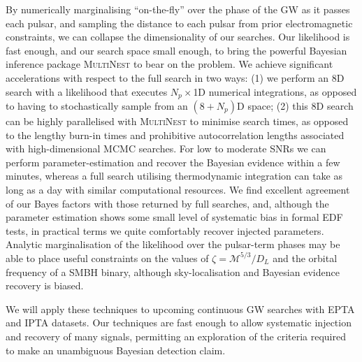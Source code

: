 \documentclass[prd,twocolumn,showpacs,nofootinbib]{revtex4}
\begin{document}
By numerically marginalising ``on-the-fly'' over the phase of the GW as it passes each pulsar, and sampling the distance to each pulsar from prior electromagnetic constraints, we can collapse the dimensionality of our searches. Our likelihood is fast enough, and our search space small enough, to bring the powerful Bayesian inference package \textsc{MultiNest} to bear on the problem. We achieve significant accelerations with respect to the full search in two ways: (1) we perform an 8D search with a likelihood that executes $N_p\times$1D numerical integrations, as opposed to having to stochastically sample from an $(8+N_p)$D space; (2) this 8D search can be highly parallelised with \textsc{MultiNest} to minimise search times, as opposed to the lengthy burn-in times and prohibitive autocorrelation lengths associated with high-dimensional MCMC searches. For low to moderate SNRs we can perform parameter-estimation and recover the Bayesian evidence within a few minutes, whereas a full search utilising thermodynamic integration can take as long as a day with similar computational resources. We find excellent agreement of our Bayes factors with those returned by full searches, and, although the parameter estimation shows some small level of systematic bias in formal EDF tests, in practical terms we quite comfortably recover injected parameters. Analytic marginalisation of the likelihood over the pulsar-term phases may be able to place useful constraints on the values of $\zeta=\mathcal{M}^{5/3}/D_L$ and the orbital frequency of a SMBH binary, although sky-localisation and Bayesian evidence recovery is biased. 

We will apply these techniques to upcoming continuous GW searches with EPTA and IPTA datasets. Our techniques are fast enough to allow systematic injection and recovery of many signals, permitting an exploration of the criteria required to make an unambiguous Bayesian detection claim.

\appendix
\end{document}
